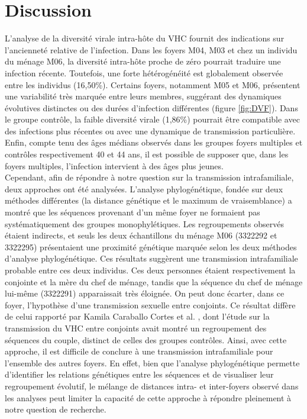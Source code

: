 \documentclass[a4paper,12pt]{article}
\begin{document}
\clearpage

\section{Discussion}

L’analyse de la diversité virale intra-hôte du VHC fournit des indications sur l’ancienneté relative de l’infection. Dans les foyers M04, M03 et chez un individu du ménage M06, la diversité intra-hôte proche de zéro pourrait traduire une infection récente. Toutefois, une forte hétérogénéité est globalement observée entre les individus (16,50\%). Certains foyers, notamment M05 et M06, présentent une variabilité très marquée entre leurs membres, suggérant des dynamiques évolutives distinctes ou des durées d’infection différentes (figure \ref{fig:DVF}). Dans le groupe contrôle, la faible diversité virale (1,86\%) pourrait être compatible avec des infections plus récentes ou avec une dynamique de transmission particulière. Enfin, compte tenu des âges médians observés dans les groupes foyers multiples et contrôles respectivement 40 et 44 ans, il est possible de supposer que, dans les foyers multiples, l’infection intervient à des âges plus jeunes.\\

Cependant, afin de répondre à notre question sur la transmission intrafamiliale, deux approches ont été analysées. L’analyse phylogénétique, fondée sur deux méthodes différentes (la distance génétique et le maximum de vraisemblance) a montré que les séquences provenant d’un même foyer ne formaient pas systématiquement des groupes monophylétiques. Les regroupements observés étaient indirects, et seuls les deux échantillons du ménage M06 (3322292 et 3322295) présentaient une proximité génétique marquée selon les deux méthodes d’analyse phylogénétique. Ces résultats suggèrent une transmission intrafamiliale probable entre ces deux individus. Ces deux personnes étaient respectivement la conjointe et la mère du chef de ménage, tandis que la séquence du chef de ménage lui-même (3322291) apparaissait très éloignée. On peut donc écarter, dans ce foyer, l’hypothèse d’une transmission sexuelle entre conjoints. Ce résultat diffère de celui rapporté par Kamila Caraballo Cortes et al. \cite{cortesSpousetoSpouseTransmissionEvolution2016}, dont l’étude sur la transmission du VHC entre conjoints avait montré un regroupement des séquences du couple, distinct de celles des groupes contrôles. Ainsi, avec cette approche, il est difficile de conclure à une transmission intrafamiliale pour l’ensemble des autres foyers. En effet, bien que l’analyse phylogénétique permette d’identifier les relations génétiques entre les séquences et de visualiser leur regroupement évolutif, le mélange de distances intra- et inter-foyers observé dans les analyses peut limiter la capacité de cette approche à répondre pleinement à notre question de recherche.\\
\end{document}
